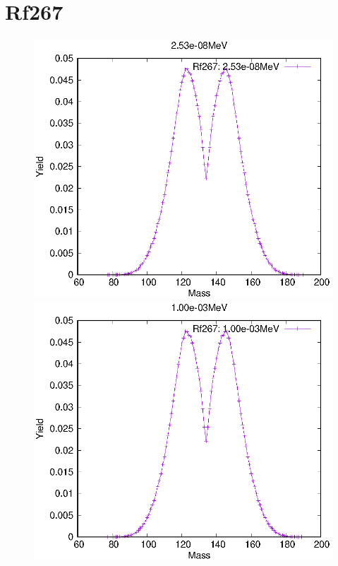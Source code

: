 \section{Rf267}
\begin{figure}[htbp]
 \begin{minipage}{0.33\textwidth} \begin{center} \includegraphics[width=\textwidth]{YA/Rf267_2.53e-08.eps} \end{center} \end{minipage}
\begin{minipage}{0.33\textwidth} \begin{center} \includegraphics[width=\textwidth]{YA/Rf267_1.00e-03.eps} \end{center} \end{minipage}

\end{figure}
